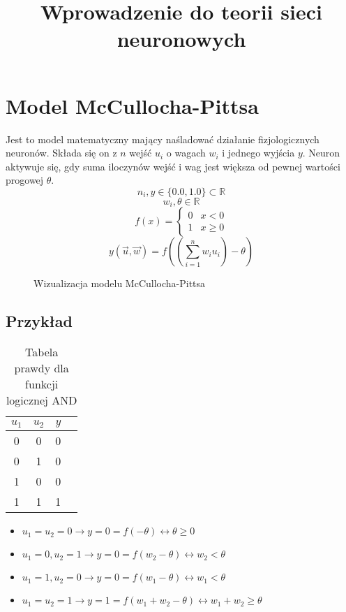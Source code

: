 \documentclass{../notatki}
\title{Wprowadzenie do teorii sieci neuronowych}
\begin{document}
\tableofcontents

\section{Model McCullocha-Pittsa}

Jest to model matematyczny mający naśladować działanie fizjologicznych neuronów.
Składa się on z $n$ wejść $u_i$ o wagach $w_i$ i jednego wyjścia $y$.
Neuron aktywuje się, gdy suma iloczynów wejść i wag jest większa od
pewnej wartości progowej $\theta$.
$$
n_i,y \in \{0.0, 1.0\} \subset \mathbb{R}
$$
$$
w_i, \theta \in \mathbb{R}
$$
$$
f(x) =
\begin{cases}
  0 & x < 0\\
  1 & x \geq 0
\end{cases}
$$
$$
y(\vec{u}, \vec{w}) = f((\sum_{i=1}^{n}w_iu_i) - \theta)
$$
\begin{figure*}[h]
  \centering
  \caption{Wizualizacja modelu McCullocha-Pittsa}
\end{figure*}

\subsection{Przykład}

\begin{table}[h]
  \centering
  \begin{tabular}{|c|c|c|c|}
    \hline
    $u_1$ & $u_2$ & $y$\\
    \hline
    0 & 0 & 0\\
    0 & 1 & 0\\
    1 & 0 & 0\\
    1 & 1 & 1\\
    \hline
  \end{tabular}
  \caption{Tabela prawdy dla funkcji logicznej AND}
\end{table}

\begin{itemize}
  \item $u_1 = u_2 = 0 \rightarrow y = 0 = f(-\theta) \leftrightarrow
    \theta \geq 0$
  \item $u_1 = 0, u_2 = 1 \rightarrow y = 0 = f(w_2 - \theta)
    \leftrightarrow w_2 < \theta$
  \item $u_1 = 1, u_2 = 0 \rightarrow y = 0 = f(w_1 - \theta)
    \leftrightarrow w_1 < \theta$
  \item $u_1 = u_2 = 1 \rightarrow y = 1 = f(w_1 + w_2 - \theta)
    \leftrightarrow w_1 + w_2 \geq \theta$
\end{itemize}
\end{document}
